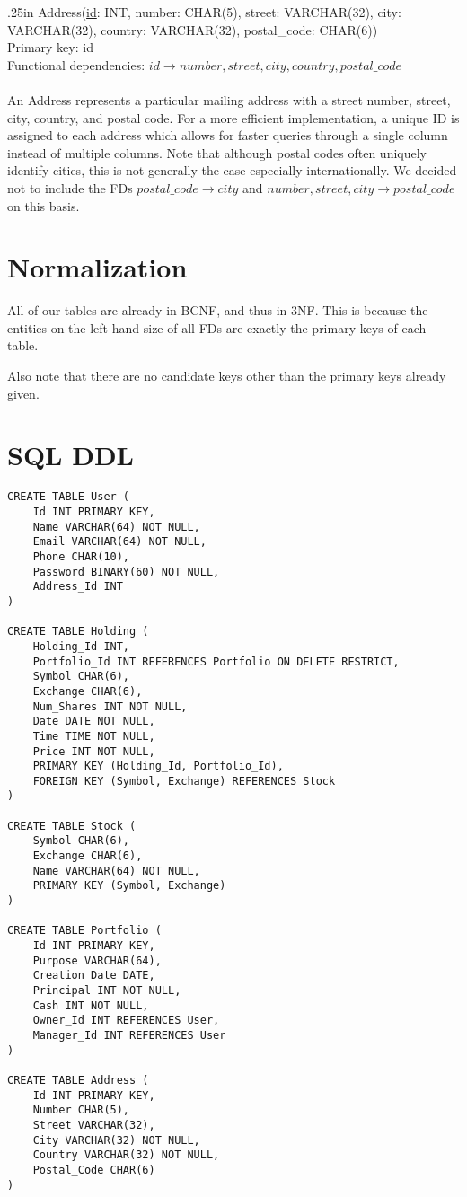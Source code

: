 \documentclass[letterpaper]{report}
\begin{document}
\hangindent .25in
{\sffamily Address(\underline{id}: INT, number: CHAR(5), street: VARCHAR(32), city: VARCHAR(32), country: VARCHAR(32), postal\_code: CHAR(6))}\\
Primary key: {\sffamily id} \\
Functional dependencies: $id \to number, street, city, country, postal\_code$ \\\\
An {\sffamily Address} represents a particular mailing address with a street number, street, city, country, and postal code. For a more efficient implementation, a unique ID is assigned to each address which allows for faster queries through a single column instead of multiple columns. Note that although postal codes often uniquely identify cities, this is not generally the case especially internationally. We decided not to include the FDs $postal\_code \to city$ and $number, street, city \to postal\_code$ on this basis.

\section*{Normalization}
All of our tables are already in BCNF, and thus in 3NF. This is because the entities on the left-hand-size of all FDs are exactly the primary keys of each table.

Also note that there are no candidate keys other than the primary keys already given.

\section*{SQL DDL}
\begin{verbatim}
CREATE TABLE User (
    Id INT PRIMARY KEY,
    Name VARCHAR(64) NOT NULL,
    Email VARCHAR(64) NOT NULL,
    Phone CHAR(10),
    Password BINARY(60) NOT NULL,
    Address_Id INT
)

CREATE TABLE Holding (
    Holding_Id INT,
    Portfolio_Id INT REFERENCES Portfolio ON DELETE RESTRICT,
    Symbol CHAR(6),
    Exchange CHAR(6),
    Num_Shares INT NOT NULL,
    Date DATE NOT NULL,
    Time TIME NOT NULL,
    Price INT NOT NULL,
    PRIMARY KEY (Holding_Id, Portfolio_Id),
    FOREIGN KEY (Symbol, Exchange) REFERENCES Stock
)

CREATE TABLE Stock (
    Symbol CHAR(6),
    Exchange CHAR(6),
    Name VARCHAR(64) NOT NULL,
    PRIMARY KEY (Symbol, Exchange)
)

CREATE TABLE Portfolio (
    Id INT PRIMARY KEY,
    Purpose VARCHAR(64),
    Creation_Date DATE,
    Principal INT NOT NULL,
    Cash INT NOT NULL,
    Owner_Id INT REFERENCES User,
    Manager_Id INT REFERENCES User
)

CREATE TABLE Address (
    Id INT PRIMARY KEY,
    Number CHAR(5),
    Street VARCHAR(32),
    City VARCHAR(32) NOT NULL,
    Country VARCHAR(32) NOT NULL,
    Postal_Code CHAR(6)
)
\end{verbatim}
\end{document}
